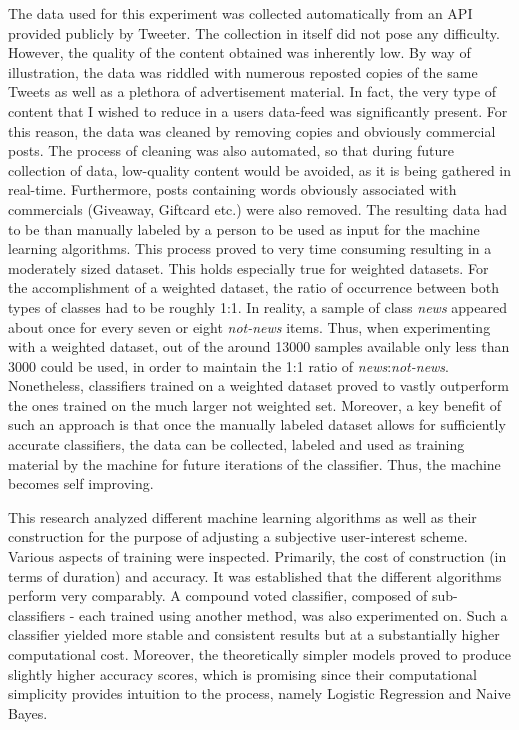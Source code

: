 	\par
	The data used for this experiment was collected automatically from an API provided publicly by Tweeter. The collection in itself did not pose any difficulty. However, the quality of the content obtained was inherently low. By way of illustration, the data was riddled with numerous reposted copies of the same Tweets as well as a plethora of advertisement material. In fact, the very type of content that I wished to reduce in a users data-feed was significantly present. For this reason, the data was cleaned by removing copies and obviously commercial posts. The process of cleaning was also automated, so that during future collection of data, low-quality content would be avoided, as it is being gathered in real-time. Furthermore, posts containing words obviously associated with commercials (Giveaway, Giftcard etc.) were also removed. The resulting data had to be than manually labeled by a person to be used as input for the machine learning algorithms. This process proved to very time consuming resulting in a moderately sized dataset. This holds especially true for weighted datasets. For the accomplishment of a weighted dataset, the ratio of occurrence between both types of classes had to be roughly 1:1. In reality, a sample of class \textit{news} appeared about once for every seven or eight \textit{not-news} items. Thus, when experimenting with a weighted dataset, out of the around 13000 samples available only less than 3000 could be used, in order to maintain the 1:1 ratio of \textit{news}:\textit{not-news}. Nonetheless, classifiers trained on a weighted dataset proved to vastly outperform the ones trained on the much larger not weighted set. Moreover, a key benefit of such an approach is that once the manually labeled dataset allows for sufficiently accurate classifiers, the data can be collected, labeled and used as training material by the machine for future iterations of the classifier. Thus, the machine becomes self improving.
	
	\par
	
	This research analyzed different machine learning algorithms as well as their construction for the purpose of adjusting a subjective user-interest scheme. Various aspects of training were inspected. Primarily, the cost of construction (in terms of duration) and accuracy. It was established that the different algorithms perform very comparably. A compound voted classifier, composed of sub-classifiers - each trained using another method, was also experimented on. Such a classifier yielded more stable and consistent results but at a substantially higher computational cost. Moreover, the theoretically simpler models proved to produce slightly higher accuracy scores, which is promising since their computational simplicity provides intuition to the process, namely Logistic Regression and Naive Bayes.
	
